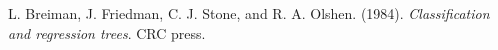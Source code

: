 \begin{thebibliography}{999}
L. Breiman, J. Friedman, C. J. Stone, and R. A. Olshen. (1984).
\textit{Classification and regression trees}.
CRC press.

\end{thebibliography}

